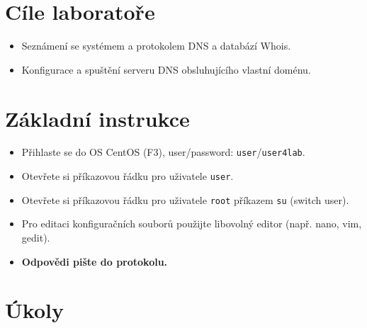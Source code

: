 \section*{Cíle laboratoře}
\begin{itemize}
  \item Seznámení se systémem a protokolem DNS a databází Whois.
  \item Konfigurace a spuštění serveru DNS obsluhujícího vlastní doménu.
\end{itemize}

\section*{Základní instrukce}
\begin{itemize}
  \item Přihlaste se do OS CentOS (F3), user/password: {\tt user}/{\tt user4lab}.
  \item Otevřete si příkazovou řádku pro uživatele {\tt user}.
  \item Otevřete si příkazovou řádku pro uživatele {\tt root} příkazem {\tt su}
    (switch user).
  \item Pro editaci konfiguračních souborů použijte libovolný editor (např.
    nano, vim, gedit).
  \item {\bf Odpovědi pište do protokolu.}
\end{itemize}

\section*{Úkoly}


